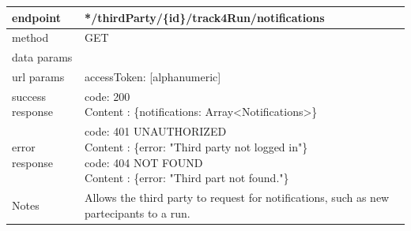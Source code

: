 \begin{legal}
\begin{legal}
\begin{itemize}
								\begin{tabularx}{\linewidth}{| l| l }
									\hline
									endpoint & */thirdParty/\{id\}/track4Run/notifications \\
									\hline
									method & GET \\
									\hline
									data params & \\
									\hline
									url params &
									\parbox{0.7\textwidth}{
										\bigskip
										accessToken: [alphanumeric]
										\bigskip
									} \\
									\hline
									success response &
									\parbox{0.7\textwidth}{
										\bigskip
										code: 200\\
										Content : \{notifications: Array<Notifications>\}
										\bigskip
									} \\
									\hline
									error response &
									\parbox{0.7\textwidth}{
										\bigskip
										code: 401 UNAUTHORIZED \\
										Content : \{error: "Third party not logged in"\}\\
										code: 404 NOT FOUND \\
										Content : \{error: "Third part not found."\}
										\bigskip
									} \\
									\hline
									Notes & 
									\parbox{0.7\textwidth}{
										\bigskip Allows the third party to request for notifications, such as new partecipants to a run.
									\bigskip}  \\
									\hline
								\end{tabularx}\\


\end{itemize}
\end{legal}
\end{legal}

